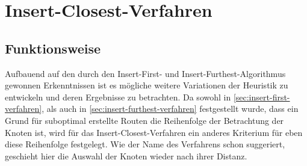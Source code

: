 \section{Insert-Closest-Verfahren} \label{sec:insert-closest-verfahren}
    \subsection{Funktionsweise}
Aufbauend auf den durch den Insert-First- und Insert-Furthest-Algorithmus gewonnen Erkenntnissen ist es mögliche weitere Variationen der Heuristik zu entwickeln und deren Ergebnisse zu betrachten.
Da sowohl in \vref{sec:insert-first-verfahren}, als auch in \vref{sec:insert-furthest-verfahren} festgestellt wurde, dass ein Grund für suboptimal erstellte Routen die Reihenfolge der Betrachtung der Knoten ist, wird für das Insert-Closest-Verfahren ein anderes Kriterium für eben diese Reihenfolge festgelegt.
Wie der Name des Verfahrens schon suggeriert, geschieht hier die Auswahl der Knoten wieder nach ihrer Distanz.


